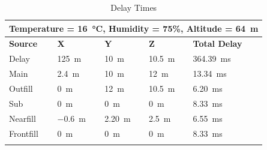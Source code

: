         \begin{longtable}[c]{|lllll|}
            \hline
            \multicolumn{5}{|l|}{Temperature = \SI{16}{\celsius}, Humidity = 75\%, Altitude = \SI{64}{\metre}} \\ \hline
            \endfirsthead
            \endhead
            \multicolumn{1}{|l|}{\textbf{Source}} & \multicolumn{1}{l|}{\textbf{X}} & \multicolumn{1}{l|}{\textbf{Y}} & \multicolumn{1}{l|}{\textbf{Z}} & \textbf{Total Delay} \\ \hline
            \multicolumn{1}{|l|}{Delay} & \multicolumn{1}{l|}{\SI{125}{\metre}} & \multicolumn{1}{l|}{\SI{10}{\metre}} & \multicolumn{1}{l|}{\SI{10.5}{\metre}} & \multicolumn{1}{l|}{\SI{364.39}{\ms}} \\ \hline
            \multicolumn{1}{|l|}{Main} & \multicolumn{1}{l|}{\SI{2.4}{\metre}} & \multicolumn{1}{l|}{\SI{10}{\metre}} & \multicolumn{1}{l|}{\SI{12}{\metre}} & \multicolumn{1}{l|}{\SI{13.34}{\ms}} \\ \hline
            \multicolumn{1}{|l|}{Outfill} & \multicolumn{1}{l|}{\SI{0}{\metre}} & \multicolumn{1}{l|}{\SI{12}{\metre}} & \multicolumn{1}{l|}{\SI{10.5}{\metre}} & \multicolumn{1}{l|}{\SI{6.20}{\ms}} \\ \hline
            \multicolumn{1}{|l|}{Sub} & \multicolumn{1}{l|}{\SI{0}{\metre}} & \multicolumn{1}{l|}{\SI{0}{\metre}} & \multicolumn{1}{l|}{\SI{0}{\metre}} & \multicolumn{1}{l|}{\SI{8.33}{\ms}} \\ \hline
            \multicolumn{1}{|l|}{Nearfill} & \multicolumn{1}{l|}{\SI{-0.6}{\metre}} & \multicolumn{1}{l|}{\SI{2.20}{\metre}} & \multicolumn{1}{l|}{\SI{2.5}{\metre}} & \multicolumn{1}{l|}{\SI{6.55}{\ms}} \\ \hline
            \multicolumn{1}{|l|}{Frontfill} & \multicolumn{1}{l|}{\SI{0}{\metre}} & \multicolumn{1}{l|}{\SI{0}{\metre}} & \multicolumn{1}{l|}{\SI{0}{\metre}} & \multicolumn{1}{l|}{\SI{8.33}{\ms}} \\ \hline

            \caption{Delay Times}
            \label{tab:delay_times}
        \end{longtable}

